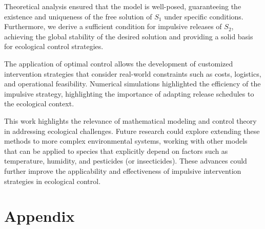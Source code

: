 \documentclass[10pt,letterpaper]{article}
\begin{document}
Theoretical analysis ensured that the model is well-posed, guaranteeing the existence and uniqueness of the free solution of $S_1$ under specific conditions. Furthermore, we derive a sufficient condition for impulsive releases of $S_2$, achieving the global stability of the desired solution and providing a solid basis for ecological control strategies.

The application of optimal control allows the development of customized intervention strategies that consider real-world constraints such as costs, logistics, and operational feasibility. Numerical simulations highlighted the efficiency of the impulsive strategy, highlighting the importance of adapting release schedules to the ecological context.

This work highlights the relevance of mathematical modeling and control theory in addressing ecological challenges. Future research could explore extending these methods to more complex environmental systems, working with other models that can be applied to species that explicitly depend on factors such as temperature, humidity, and pesticides (or insecticides). These advances could further improve the applicability and effectiveness of impulsive intervention strategies in ecological control.

\appendix
\section*{Appendix}
\end{document}
